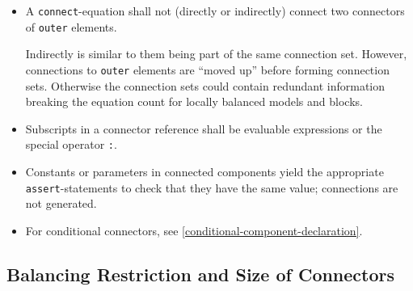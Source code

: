 \begin{itemize}
\begin{nonnormative}
  Note that variables with different quantities may be unit-compatible, as seen in the example of work and torque.
  It is also possible to include medium-information in the quantity to detect connections between different liquids.
  \end{nonnormative}
\item
  A \lstinline!connect!-equation shall not (directly or indirectly) connect two connectors of \lstinline!outer! elements.
  \begin{nonnormative}
  Indirectly is similar to them being part of the same connection set.
  However, connections to \lstinline!outer! elements are ``moved up'' before forming connection sets.
  Otherwise the connection sets could contain redundant information breaking the equation count for locally balanced models and blocks.
  \end{nonnormative}
\item
  Subscripts in a connector reference shall be evaluable expressions or the special operator \lstinline!:!.
\item
  Constants or parameters in connected components yield the appropriate \lstinline!assert!-statements to check that they have the same value; connections are not generated.
\item
  For conditional connectors, see \cref{conditional-component-declaration}.
\end{itemize}

\subsection{Balancing Restriction and Size of Connectors}\label{balancing-restriction-and-size-of-connectors}

